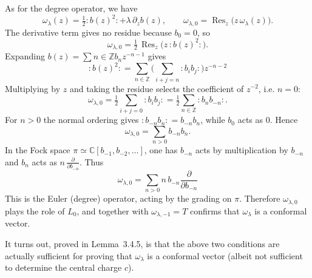 \documentclass[12pt]{article}
\begin{document}
\begin{example}
    As for the degree operator, we have
    \[
        \omega_\lambda(z) = \tfrac12:b(z)^2: + \lambda\,\partial_z b(z),
        \qquad
        \omega_{\lambda,0} = \operatorname{Res}_z\big(z\,\omega_\lambda(z)\big).
    \]
    The derivative term gives no residue because $b_0=0$, so
    \[
        \omega_{\lambda,0} = \tfrac12\,\operatorname{Res}_z\big(z\,:b(z)^2:\big).
    \]
    Expanding $b(z)=\sum{n\in\mathbb Z} b_n z^{-n-1}$ gives
    \[:b(z)^2: = \sum_{n\in\mathbb Z}\Big(\sum_{i+j=n} :b_i b_j:\Big) z^{-n-2}\]
    Multiplying by $z$ and taking the residue selects the coefficient of $z^{-2}$, i.e. $n=0$:
    \[
        \omega_{\lambda,0} = \tfrac12\sum_{i+j=0} :b_i b_j: = \tfrac12\sum_{n\in\mathbb Z} :b_n b_{-n}:.
    \]
    For $n>0$ the normal ordering gives $:b_{-n}b_n: = b_{-n}b_n$, while $b_0$ acts as $0$. Hence
    \[
        \omega_{\lambda,0} = \sum_{n>0} b_{-n}b_n.
    \]
    In the Fock space $\pi\simeq\mathbb C[b_{-1},b_{-2},\dots]$, one has $b_{-n}$ acts by multiplication by $b_{-n}$ and
    $b_n$ acts as $n\,\frac{\partial}{\partial b_{-n}}$. Thus
    \[
        \omega_{\lambda,0} = \sum_{n>0} n\,b_{-n}\frac{\partial}{\partial b_{-n}}
    \]
    This is the Euler (degree) operator, acting by the grading on $\pi$.  Therefore $\omega_{\lambda,0}$ plays the role of $L_0$, and together with $\omega_{\lambda,-1}=T$ confirms that $\omega_\lambda$ is a conformal vector.

    It turns out, proved in Lemma~3.4.5, is that the above two conditions are actually sufficient for proving that $\omega_\lambda$ is a conformal vector (albeit not sufficient to determine the central charge $c$).
\end{example}
\end{document}
